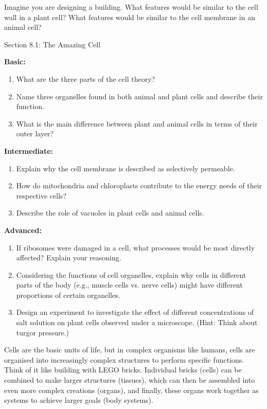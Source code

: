 \begin{stopandthink}
Imagine you are designing a building. What features would be similar to the cell wall in a plant cell?  What features would be similar to the cell membrane in an animal cell?
\end{stopandthink}


\begin{tieredquestions}{Section 8.1: The Amazing Cell}

\textbf{Basic:}
\begin{enumerate}
    \item What are the three parts of the cell theory?
    \item Name three organelles found in both animal and plant cells and describe their function.
    \item What is the main difference between plant and animal cells in terms of their outer layer?
\end{enumerate}

\textbf{Intermediate:}
\begin{enumerate}
    \item Explain why the cell membrane is described as selectively permeable.
    \item How do mitochondria and chloroplasts contribute to the energy needs of their respective cells?
    \item Describe the role of vacuoles in plant cells and animal cells.
\end{enumerate}

\textbf{Advanced:}
\begin{enumerate}
    \item  If ribosomes were damaged in a cell, what processes would be most directly affected? Explain your reasoning.
    \item  Considering the functions of cell organelles, explain why cells in different parts of the body (e.g., muscle cells vs. nerve cells) might have different proportions of certain organelles.
    \item  Design an experiment to investigate the effect of different concentrations of salt solution on plant cells observed under a microscope.  (Hint: Think about turgor pressure.)
\end{enumerate}
\end{tieredquestions}


\FloatBarrier

Cells are the basic units of life, but in complex organisms like humans, cells are organised into increasingly complex structures to perform specific functions.  Think of it like building with LEGO bricks. Individual bricks (cells) can be combined to make larger structures (tissues), which can then be assembled into even more complex creations (organs), and finally, these organs work together as systems to achieve larger goals (body systems).

